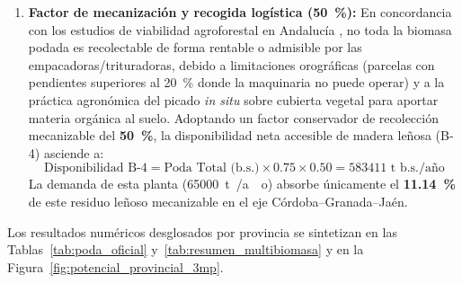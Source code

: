 \documentclass{report}
\begin{document}
\begin{enumerate}
    \item \textbf{Factor de mecanización y recogida logística (\SI{50}{\percent}):} En concordancia con los estudios de viabilidad agroforestal en Andalucía \autocite{CAP2008, MoranAlarcon2026}, no toda la biomasa podada es recolectable de forma rentable o admisible por las empacadoras/trituradoras, debido a limitaciones orográficas (parcelas con pendientes superiores al \SI{20}{\percent} donde la maquinaria no puede operar) y a la práctica agronómica del picado \textit{in situ} sobre cubierta vegetal para aportar materia orgánica al suelo. Adoptando un factor conservador de recolección mecanizable del \textbf{\SI{50}{\percent}}, la disponibilidad neta accesible de madera leñosa (B-4) asciende a:
    \begin{equation}
    \text{Disponibilidad B-4} = \text{Poda Total (b.s.)} \times 0.75 \times 0.50 = \num{583411}\text{ t b.s./año}
    \label{eq:disp_madera_poda}
    \end{equation}
    La demanda de esta planta (\SI{65000}{\tonne{}/ao}) absorbe únicamente el \textbf{\SI{11.14}{\percent}} de este residuo leñoso mecanizable en el eje Córdoba--Granada--Jaén.
\end{enumerate}
Los resultados numéricos desglosados por provincia se sintetizan en las Tablas~\ref{tab:poda_oficial} y~\ref{tab:resumen_multibiomasa} y en la Figura~\ref{fig:potencial_provincial_3mp}.
\end{document}
